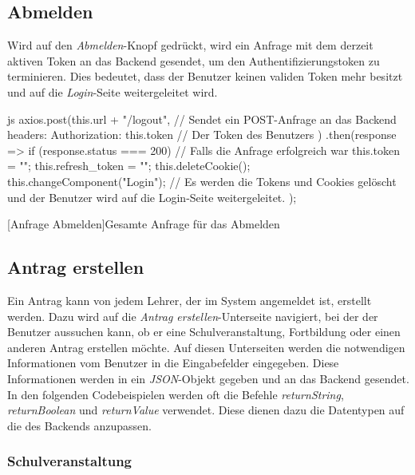 \subsection{Abmelden}
Wird auf den \textit{Abmelden}-Knopf gedrückt, wird ein Anfrage mit dem derzeit aktiven Token an das Backend gesendet, um den Authentifizierungstoken zu terminieren. Dies bedeutet, dass der Benutzer keinen validen Token mehr besitzt und auf die \textit{Login}-Seite weitergeleitet wird.
\begin{code}{js}
axios.post(this.url + "/logout", {	// Sendet ein POST-Anfrage an das Backend
	headers: { Authorization: this.token }	// Der Token des Benutzers
})
.then(response => {
	if (response.status === 200) {	// Falls die Anfrage erfolgreich war
		this.token = "";
		this.refresh_token = "";
		this.deleteCookie();
		this.changeComponent("Login");	// Es werden die Tokens und Cookies gelöscht und der Benutzer wird auf die Login-Seite weitergeleitet.
	}
});
\end{code}
[Anfrage Abmelden]{Gesamte Anfrage für das Abmelden}~\\
\newpage
\subsection{Antrag erstellen}
Ein Antrag kann von jedem Lehrer, der im System angemeldet ist, erstellt werden. Dazu wird auf die \textit{Antrag erstellen}-Unterseite navigiert, bei der der Benutzer aussuchen kann, ob er eine Schulveranstaltung, Fortbildung oder einen anderen Antrag erstellen möchte. Auf diesen Unterseiten werden die notwendigen Informationen vom Benutzer in die Eingabefelder eingegeben. Diese Informationen werden in ein \textit{JSON}-Objekt gegeben und an das Backend gesendet.
\\
In den folgenden Codebeispielen werden oft die Befehle \textit{returnString}, \textit{returnBoolean} und \textit{returnValue} verwendet. Diese dienen dazu die Datentypen auf die des Backends anzupassen. 
\subsubsection{Schulveranstaltung}
